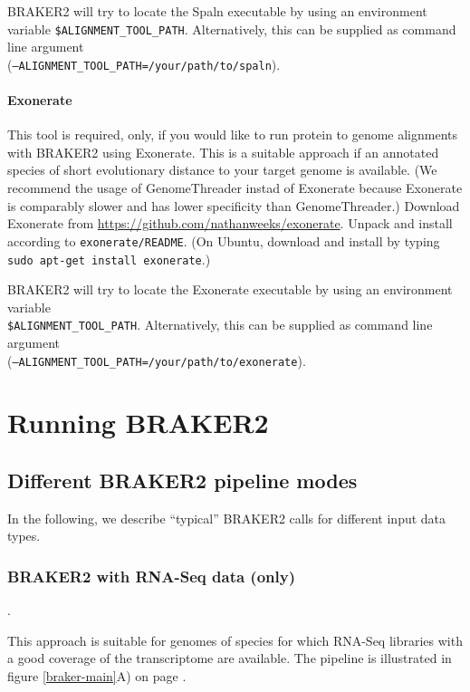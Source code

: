 \documentclass[a4paper,10pt]{report}
\begin{document}
BRAKER2 will try to locate the Spaln executable by using an environment variable \texttt{\$ALIGNMENT\_TOOL\_PATH}. Alternatively, this can be supplied as command line argument \\(\texttt{--ALIGNMENT\_TOOL\_PATH=/your/path/to/spaln}).

\subsubsection{Exonerate}

This tool is required, only, if you would like to run protein to genome alignments with BRAKER2 using Exonerate. This is a suitable approach if an annotated species of short evolutionary distance to your target genome is available. (We recommend the usage of GenomeThreader instad of Exonerate because Exonerate is comparably slower and has lower specificity than GenomeThreader.) Download Exonerate from \url{https://github.com/nathanweeks/exonerate}. Unpack and install according to \texttt{exonerate/README}. (On Ubuntu, download and install by typing  \texttt{sudo apt-get install exonerate}.)

BRAKER2 will try to locate the Exonerate executable by using an environment variable \\\texttt{\$ALIGNMENT\_TOOL\_PATH}. Alternatively, this can be supplied as command line argument \\(\texttt{--ALIGNMENT\_TOOL\_PATH=/your/path/to/exonerate}).

\chapter{Running BRAKER2}

\section{Different BRAKER2 pipeline modes}

In the following, we describe ``typical'' BRAKER2 calls for different input data types.

\subsection{BRAKER2 with RNA-Seq data (only)}\label{braker1}.

This approach is suitable for genomes of species for which RNA-Seq libraries with a good coverage of the transcriptome are available. The pipeline is illustrated in figure \ref{braker-main}A) on page \pageref{braker-main}.
\end{document}

